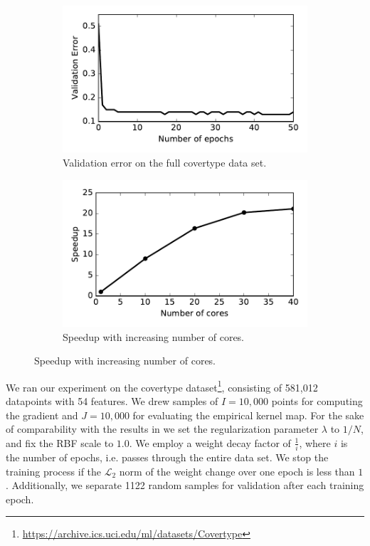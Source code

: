 \documentclass{article} %
\begin{document}
\begin{figure}[!ht]
	\begin{subfigure}[b]{0.45\textwidth}
		\centering
		\includegraphics[width=\textwidth]{imgs/covertype_validation.pdf}
		\caption{\centering Validation error on the full covertype data set.}
		\label{fig:covertype_validation}
	\end{subfigure}
  \hfill
	\begin{subfigure}[b]{0.45\textwidth}
		\centering
		\includegraphics[width=\textwidth]{imgs/speedup_58.pdf}
		\caption{\centering Speedup with increasing number of cores.}
		\label{fig:speedup_58}
	\end{subfigure}
\end{figure}

We ran our experiment on the covertype dataset\footnote{\url{https://archive.ics.uci.edu/ml/datasets/Covertype}}, consisting of 581,012 datapoints with 54 features. We drew samples of $I=10,000$ points for computing the gradient and $J=10,000$ for evaluating the empirical kernel map. For the sake of comparability with the results in \cite{Dai2014} we set the regularization parameter $\lambda$ to $1 / N$, and fix the RBF scale to $1.0$. We employ a weight decay factor of $\frac{1}{i}$, where $i$ is the number of epochs, i.e. passes through the entire data set. We stop the training process if the $\mathcal{L}_{2}$ norm of the weight change over one epoch is less than $1$. Additionally, we separate 1122 random samples for validation after each training epoch.
\end{document}
